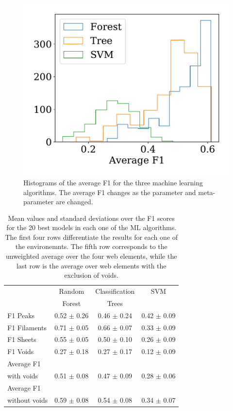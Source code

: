 \documentclass[usenatbib]{mnras}
\begin{document}
\begin{figure}
    \includegraphics[scale=0.55]{Figs/p_hist_f1.pdf}
    \caption{Histograms of the average F1 for the three machine
      learning algorithms.
      The average F1 changes as the parameter and meta-parameter
      are changed.}
    \label{fig:methods}
\end{figure}



\begin{table}
\centering
\begin{tabular}{p{1.8cm}ccc}
\hline
                  & Random               & Classification        & SVM\\
                  & Forest               & Trees                &  \\
\hline
 F1 Peaks               & 0.52 $\pm$ 0.26  & 0.46 $\pm$ 0.24 & 0.42 $\pm$ 0.09  \\
 F1 Filaments          & 0.71 $\pm$ 0.05 & 0.66 $\pm$ 0.07 & 0.33 $\pm$ 0.09 \\
 F1 Sheets             & 0.55 $\pm$ 0.05 & 0.50 $\pm$ 0.10 & 0.26 $\pm$ 0.09 \\
 F1 Voids              & 0.27 $\pm$ 0.18 & 0.27 $\pm$ 0.17 & 0.12 $\pm$ 0.09 \\
 Average F1\\ with voids    & 0.51 $\pm$ 0.08 & 0.47 $\pm$ 0.09 & 0.28 $\pm$ 0.06 \\
 Average F1\\ without voids & 0.59 $\pm$ 0.08 & 0.54 $\pm$ 0.08 & 0.34 $\pm$ 0.07 \\
\hline
\end{tabular}
\caption{Mean values and standard deviations over the F1
  scores for the 20 best models in each one of the ML algorithms.
  The first four rows differentiate the results for each one of the
  environemnts.
  The fifth row corresponds to the unweighted average over the four
  web elements, while the last row is the average over web elements
  with the exclusion of voids.}
\label{table:elements}
\end{table}
\end{document}
